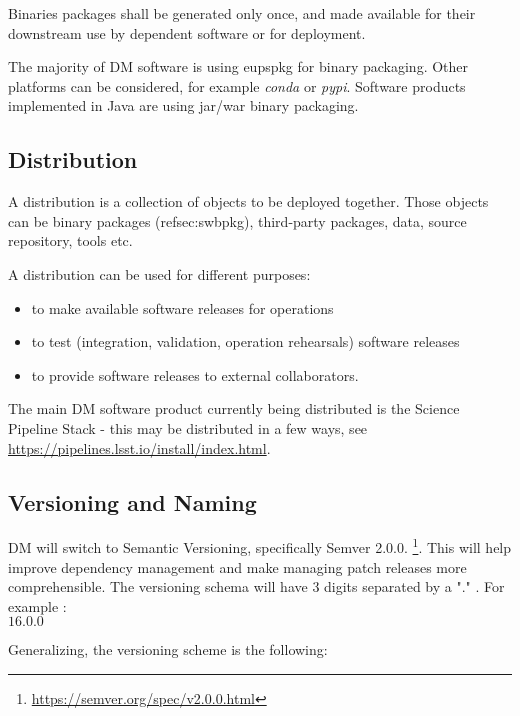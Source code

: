 Binaries packages shall be generated only once, and made available for their downstream use by dependent software or for deployment.

The majority of DM software is using eupspkg for binary packaging. Other platforms can be considered, for example \textit{conda} or \textit{pypi}.
Software products implemented in Java are using jar/war binary packaging.


\subsection{Distribution} \label{sec:distribution}

A distribution is a collection of objects to be deployed together.
Those objects can be binary packages (ref{sec:swbpkg}), third-party packages, data, source repository, tools etc.

A distribution can be used for different purposes:

\begin{itemize}
\item to make available software releases for operations
\item to test (integration, validation, operation rehearsals) software releases
\item to provide software releases to external collaborators.
\end{itemize}

The main DM software product currently being distributed is the Science Pipeline Stack -
this may be distributed in a few ways, see \url{https://pipelines.lsst.io/install/index.html}.


\subsection{Versioning and Naming} \label{sec:versioning}
DM will  switch to Semantic Versioning, specifically Semver 2.0.0. \footnote{\url{https://semver.org/spec/v2.0.0.html}}.
This will help improve dependency management and make managing patch releases more comprehensible.
The versioning schema will have 3 digits separated by a "." . For example :
\\
$16.0.0$

Generalizing, the versioning scheme is the following:

